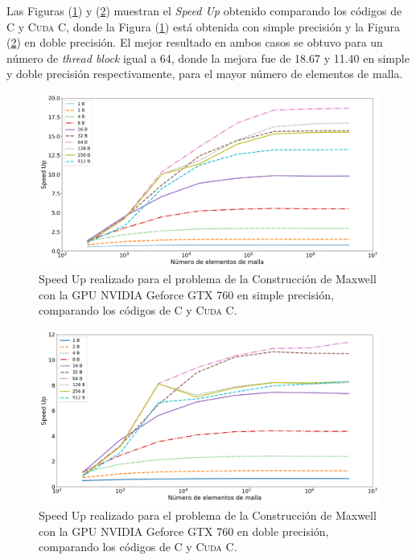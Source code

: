 Las Figuras (\ref{fig:s_760_MxC_simple_1.0}) y (\ref{fig:s_760_MxC_double_1.0}) muestran el \textit{Speed Up} obtenido comparando los códigos de \textsc{C} y \textsc{Cuda C}, donde la Figura (\ref{fig:s_760_MxC_simple_1.0}) está obtenida con simple precisión y la Figura (\ref{fig:s_760_MxC_double_1.0}) en doble precisión. El mejor resultado en ambos casos se obtuvo para un número de \textit{thread block} igual a 64, donde la mejora fue de 18.67 y 11.40 en simple y doble precisión respectivamente, para el mayor número de elementos de malla.


\begin{figure}[htbp]
	\centering
	\includegraphics[width=\textwidth]{figs/cap4/s_760_MxC_simple_10}
	\caption{Speed Up realizado para el problema de la Construcción de Maxwell con la GPU NVIDIA Geforce GTX 760 en simple precisión, comparando los códigos de \textsc{C} y \textsc{Cuda C}.} 
	\label{fig:s_760_MxC_simple_1.0}	
\end{figure}

\begin{figure}[htbp]
	\centering
	\includegraphics[width=\textwidth]{figs/cap4/s_760_MxC_double_10}
	\caption{Speed Up realizado para el problema de la Construcción de Maxwell con la GPU NVIDIA Geforce GTX 760 en doble precisión, comparando los códigos de \textsc{C} y \textsc{Cuda C}.} 
	\label{fig:s_760_MxC_double_1.0}	
\end{figure}

